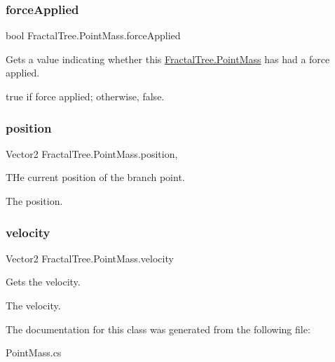 \subsubsection{\texorpdfstring{force\+Applied}{forceApplied}}
{\footnotesize\ttfamily bool Fractal\+Tree.\+Point\+Mass.\+force\+Applied\hspace{0.3cm}{\ttfamily [get]}}



Gets a value indicating whether this \hyperlink{class_fractal_tree_1_1_point_mass}{Fractal\+Tree.\+Point\+Mass} has had a force applied. 

{\ttfamily true} if force applied; otherwise, {\ttfamily false}.\hypertarget{class_fractal_tree_1_1_point_mass_a388c55b55d073a8962d8c4e61ce4fd94}{}\label{class_fractal_tree_1_1_point_mass_a388c55b55d073a8962d8c4e61ce4fd94} 
\subsubsection{\texorpdfstring{position}{position}}
{\footnotesize\ttfamily Vector2 Fractal\+Tree.\+Point\+Mass.\+position\hspace{0.3cm}{\ttfamily [get]}, {\ttfamily [set]}}



T\+He current position of the branch point. 

The position.\hypertarget{class_fractal_tree_1_1_point_mass_a1cbd0cc0eacfadb549cbc5fdb87ccbb1}{}\label{class_fractal_tree_1_1_point_mass_a1cbd0cc0eacfadb549cbc5fdb87ccbb1} 
\subsubsection{\texorpdfstring{velocity}{velocity}}
{\footnotesize\ttfamily Vector2 Fractal\+Tree.\+Point\+Mass.\+velocity\hspace{0.3cm}{\ttfamily [get]}}



Gets the velocity. 

The velocity.

The documentation for this class was generated from the following file\+:\begin{DoxyCompactItemize}
\item 
Point\+Mass.\+cs\end{DoxyCompactItemize}
